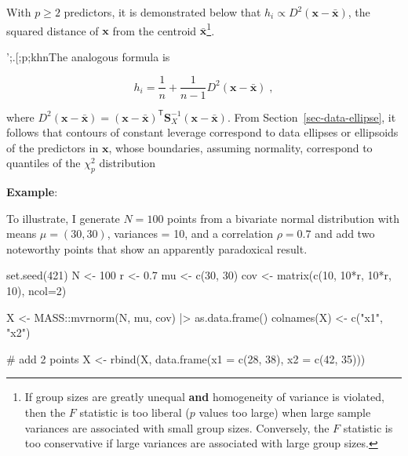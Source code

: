 \documentclass[
  letterpaper,
  10pt,
  krantz2]{krantz}
\makeatletter
\newenvironment{Shaded}{\begin{snugshade}}{\end{snugshade}}
\newcommand{\AttributeTok}[1]{\textcolor[rgb]{0.40,0.45,0.13}{#1}}
\newcommand{\CommentTok}[1]{\textcolor[rgb]{0.37,0.37,0.37}{#1}}
\newcommand{\DecValTok}[1]{\textcolor[rgb]{0.68,0.00,0.00}{#1}}
\newcommand{\FloatTok}[1]{\textcolor[rgb]{0.68,0.00,0.00}{#1}}
\newcommand{\FunctionTok}[1]{\textcolor[rgb]{0.28,0.35,0.67}{#1}}
\newcommand{\NormalTok}[1]{\textcolor[rgb]{0.00,0.23,0.31}{#1}}
\newcommand{\OtherTok}[1]{\textcolor[rgb]{0.00,0.23,0.31}{#1}}
\newcommand{\SpecialCharTok}[1]{\textcolor[rgb]{0.37,0.37,0.37}{#1}}
\newcommand{\StringTok}[1]{\textcolor[rgb]{0.13,0.47,0.30}{#1}}
\newenvironment{kframe}{%
  \medskip{}
  \setlength{\fboxsep}{.8em}
  \def\at@end@of@kframe{}%
  \ifinner\ifhmode%
  \def\at@end@of@kframe{\end{minipage}}%
  \begin{minipage}{\columnwidth}%
  \fi\fi%
  \def\FrameCommand##1{\hskip\@totalleftmargin \hskip-\fboxsep
  \colorbox{shadecolor}{##1}\hskip-\fboxsep
      \hskip-\linewidth \hskip-\@totalleftmargin \hskip\columnwidth}%
  \MakeFramed {\advance\hsize-\width
    \@totalleftmargin\z@ \linewidth\hsize
    \@setminipage}}%
{\par\unskip\endMakeFramed%
  \at@end@of@kframe}
\renewenvironment{Shaded}{\begin{kframe}}{\end{kframe}}
\makeatother
\begin{document}
With \(p \ge 2\) predictors, it is demonstrated below that
\(h_i \propto D^2 (\mathbf{x} - \bar{\mathbf{x}})\), the squared
distance of \(\mathbf{x}\) from the centroid
\(\bar{\mathbf{x}}\)\footnote{If group sizes are greatly unequal
  \textbf{and} homogeneity of variance is violated, then the \(F\)
  statistic is too liberal (\(p\) values too large) when large sample
  variances are associated with small group sizes. Conversely, the \(F\)
  statistic is too conservative if large variances are associated with
  large group sizes.}.

';.{[};p;khnThe analogous formula is

\[
h_i = \frac{1}{n} + \frac{1}{n-1} D^2 (\mathbf{x} - \bar{\mathbf{x}}) \; ,
\]

where
\(D^2 (\mathbf{x} - \bar{\mathbf{x}}) = (\mathbf{x} - \bar{\mathbf{x}})^\mathsf{T} \mathbf{S}_X^{-1} (\mathbf{x} - \bar{\mathbf{x}})\).
From Section~\ref{sec-data-ellipse}, it follows that contours of
constant leverage correspond to data ellipses or ellipsoids of the
predictors in \(\mathbf{x}\), whose boundaries, assuming normality,
correspond to quantiles of the \(\chi^2_p\) distribution

\textbf{Example}:

To illustrate, I generate \(N = 100\) points from a bivariate normal
distribution with means \(\mu = (30, 30)\), variances = 10, and a
correlation \(\rho = 0.7\) and add two noteworthy points that show an
apparently paradoxical result.

\begin{Shaded}
\begin{Highlighting}[]
\FunctionTok{set.seed}\NormalTok{(}\DecValTok{421}\NormalTok{)}
\NormalTok{N }\OtherTok{\textless{}{-}} \DecValTok{100}
\NormalTok{r }\OtherTok{\textless{}{-}} \FloatTok{0.7}
\NormalTok{mu }\OtherTok{\textless{}{-}} \FunctionTok{c}\NormalTok{(}\DecValTok{30}\NormalTok{, }\DecValTok{30}\NormalTok{)}
\NormalTok{cov }\OtherTok{\textless{}{-}} \FunctionTok{matrix}\NormalTok{(}\FunctionTok{c}\NormalTok{(}\DecValTok{10}\NormalTok{,   }\DecValTok{10}\SpecialCharTok{*}\NormalTok{r,}
                \DecValTok{10}\SpecialCharTok{*}\NormalTok{r, }\DecValTok{10}\NormalTok{), }\AttributeTok{ncol=}\DecValTok{2}\NormalTok{)}

\NormalTok{X }\OtherTok{\textless{}{-}}\NormalTok{ MASS}\SpecialCharTok{::}\FunctionTok{mvrnorm}\NormalTok{(N, mu, cov) }\SpecialCharTok{|\textgreater{}} \FunctionTok{as.data.frame}\NormalTok{()}
\FunctionTok{colnames}\NormalTok{(X) }\OtherTok{\textless{}{-}} \FunctionTok{c}\NormalTok{(}\StringTok{"x1"}\NormalTok{, }\StringTok{"x2"}\NormalTok{)}

\CommentTok{\# add 2 points}
\NormalTok{X }\OtherTok{\textless{}{-}} \FunctionTok{rbind}\NormalTok{(X,}
           \FunctionTok{data.frame}\NormalTok{(}\AttributeTok{x1 =} \FunctionTok{c}\NormalTok{(}\DecValTok{28}\NormalTok{, }\DecValTok{38}\NormalTok{),}
                      \AttributeTok{x2 =} \FunctionTok{c}\NormalTok{(}\DecValTok{42}\NormalTok{, }\DecValTok{35}\NormalTok{)))}
\end{Highlighting}
\end{Shaded}
\end{document}
